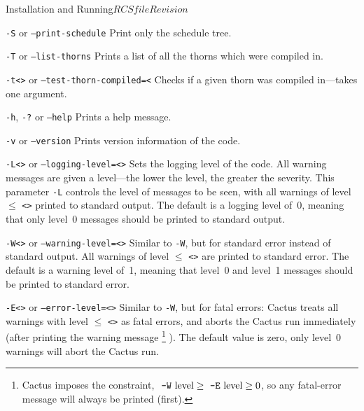 \begin{cactuspart}{Installation and Running}{$RCSfile$}{$Revision$}
\begin{Lentry}
\item [\texttt{-S} or \texttt{--print-schedule}]
Print only the schedule tree.

\item [\texttt{-T} or \texttt{--list-thorns}]
Prints a list of all the thorns which were compiled in.

\item [\texttt{-t<\var{arrangement or thorn}>} or \texttt{--test-thorn-compiled=<\var{arrangement or thorn>}} ]
Checks if a given thorn was compiled in---takes one argument.

\item [\texttt{-h}, \texttt{-?} or \texttt{--help}]
Prints a help message.

\item [\texttt{-v} or \texttt{--version}]
Prints version information of the code.


\item [\texttt{-L<\var{level}>} or \texttt{--logging-level=<\var{level}>}]
Sets the logging level of the code.  All warning messages are given a
level---the lower the level, the greater the severity.  This
parameter \texttt{-L} controls the level of messages to be seen, with all
warnings of level $\le$ \texttt{<>} printed to standard output.  The
default is a logging level of~0, meaning that only level~0 messages
should be printed to standard output.

\item [\texttt{-W<\var{level}>} or \texttt{--warning-level=<\var{level}>}]
Similar to \texttt{-W}, but for standard error instead of
standard output.  All warnings of level $\le$ \texttt{<>} are
printed to standard error.  The default is a warning level of~1,
meaning that level~0 and level~1 messages should be printed to
standard error.

\item [\texttt{-E<\var{level}>} or \texttt{--error-level=<\var{level}>}]
Similar to \texttt{-W}, but for fatal errors: Cactus treats all
warnings with level $\le$ \texttt{<>} as fatal errors, and aborts
the Cactus run immediately (after printing the warning message%
\footnote{%
         Cactus imposes the constraint,
         $\hbox{ \texttt{-W} level} \ge \hbox{ \texttt{-E} level} \ge 0$,
         so any fatal-error message will always be printed (first).
         }%
).  The default value is zero, \ie{} only level~0 warnings
will abort the Cactus run.


\end{Lentry}
\end{cactuspart}
